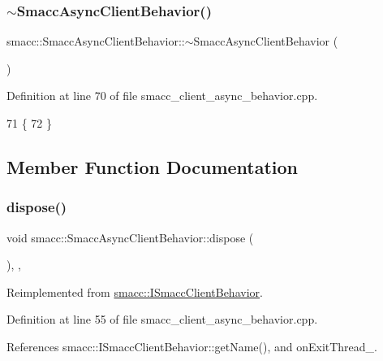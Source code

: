 \subsubsection{\texorpdfstring{$\sim$\+Smacc\+Async\+Client\+Behavior()}{~SmaccAsyncClientBehavior()}}
{\footnotesize\ttfamily smacc\+::\+Smacc\+Async\+Client\+Behavior\+::$\sim$\+Smacc\+Async\+Client\+Behavior (\begin{DoxyParamCaption}{ }\end{DoxyParamCaption})\hspace{0.3cm}{\ttfamily [virtual]}}



Definition at line 70 of file smacc\+\_\+client\+\_\+async\+\_\+behavior.\+cpp.


\begin{DoxyCode}
71     \{
72     \}
\end{DoxyCode}


\subsection{Member Function Documentation}
\mbox{\label{classsmacc_1_1SmaccAsyncClientBehavior_af475cee853947a8d3f513c7fb9789e7a}} 
\subsubsection{\texorpdfstring{dispose()}{dispose()}}
{\footnotesize\ttfamily void smacc\+::\+Smacc\+Async\+Client\+Behavior\+::dispose (\begin{DoxyParamCaption}{ }\end{DoxyParamCaption})\hspace{0.3cm}{\ttfamily [override]}, {\ttfamily [protected]}, {\ttfamily [virtual]}}



Reimplemented from \hyperlink{classsmacc_1_1ISmaccClientBehavior_abdc74a8d95fdd02794c19dfa90f8a6ce}{smacc\+::\+I\+Smacc\+Client\+Behavior}.



Definition at line 55 of file smacc\+\_\+client\+\_\+async\+\_\+behavior.\+cpp.



References smacc\+::\+I\+Smacc\+Client\+Behavior\+::get\+Name(), and on\+Exit\+Thread\+\_\+.


